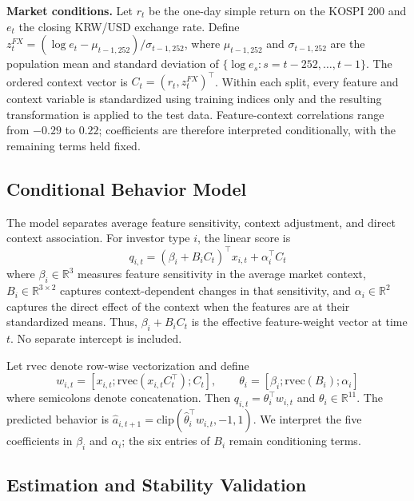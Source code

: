 \textbf{Market conditions.}
Let $r_t$ be the one-day simple return on the KOSPI 200 and $e_t$ the closing KRW/USD
exchange rate. Define
$z^{FX}_t=(\log e_t-\mu_{t-1,252})/\sigma_{t-1,252}$, where
$\mu_{t-1,252}$ and $\sigma_{t-1,252}$ are the population mean and standard deviation of
$\{\log e_s:s=t-252,\ldots,t-1\}$. The ordered context vector is
$C_t=(r_t,z^{FX}_t)^\top$. Within each split, every feature and context variable is
standardized using training indices only and the resulting transformation is applied to
the test data. Feature-context correlations range from $-0.29$ to $0.22$; coefficients
are therefore interpreted conditionally, with the remaining terms held fixed.

\subsection{Conditional Behavior Model}
\label{sec:model}

The model separates average feature sensitivity, context adjustment, and direct context
association. For investor type $i$, the linear score is
\begin{equation}
q_{i,t}=(\beta_i+B_iC_t)^\top x_{i,t}+\alpha_i^\top C_t
\label{eq:model}
\end{equation}
where $\beta_i\in\mathbb R^3$ measures feature sensitivity in the average market context,
$B_i\in\mathbb R^{3\times2}$ captures context-dependent changes in that sensitivity, and
$\alpha_i\in\mathbb R^2$ captures the direct effect of the context when the features are
at their standardized means. Thus, $\beta_i+B_iC_t$ is the effective feature-weight vector
at time $t$. No separate intercept is included.

Let $\mathrm{rvec}$ denote row-wise vectorization and define
{\small
\[
w_{i,t}=[x_{i,t};\mathrm{rvec}(x_{i,t}C_t^\top);C_t],\qquad
\theta_i=[\beta_i;\mathrm{rvec}(B_i);\alpha_i]
\]
}
where semicolons denote concatenation. Then
$q_{i,t}=\theta_i^\top w_{i,t}$ and $\theta_i\in\mathbb R^{11}$. The predicted behavior is
$\hat a_{i,t+1}=\mathrm{clip}(\hat\theta_i^\top w_{i,t},-1,1)$. We interpret the five
coefficients in $\beta_i$ and $\alpha_i$; the six entries of $B_i$ remain conditioning terms.

\subsection{Estimation and Stability Validation}
\label{sec:protocol}

